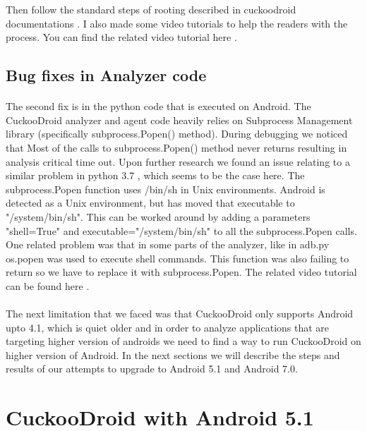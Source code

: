 \documentclass[../main.tex]{subfile}
\begin{document}
		Then follow the standard steps of rooting described in cuckoodroid documentations \cite{cuckoodroid_docs}. I also made some video tutorials to help the readers with the process. You can find the related video tutorial here \cite{rooting_youtube}.
		
				
		\subsection{Bug fixes in Analyzer code}
		\paragraph{} The second fix is in the python code that is executed on Android. The CuckooDroid analyzer and agent code heavily relies on Subprocess Management library \cite{subprocess_management_library} (specifically subprocess.Popen() method). During debugging we noticed that Most of the calls to subprocess.Popen() method never returns resulting in analysis critical time out. Upon further research we found an issue relating to a similar problem in python 3.7 \cite{subprocess.popen_issue16255}, which seems to be the case here. The subprocess.Popen function uses /bin/sh in Unix environments. Android is detected as a Unix environment, but has moved that executable to "/system/bin/sh". This can be worked around by adding a parameters "shell=True" and executable="/system/bin/sh" to all the subprocess.Popen calls. One related problem was that in some parts of the analyzer, like in adb.py os.popen was used to execute shell commands. This function was also failing to return so we have to replace it with subprocess.Popen. The related video tutorial can be found here \cite{subprocess_youtube}.
		
		\paragraph{} The next limitation that we faced was that CuckooDroid only supports Android upto 4.1, which is quiet older and in order to analyze applications that are targeting higher version of androids we need to find a way to run CuckooDroid on higher version of Android. In the next sections we will describe the steps and results of our attempts to upgrade to Android 5.1 and Android 7.0.

		\section{CuckooDroid with Android 5.1}
\end{document}
